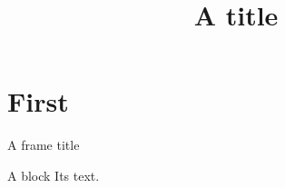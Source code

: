 \documentclass[aspectratio=169]{beamer}
\title{A title}
\begin{document}
\section{First}
\begin{frame}{A frame title}
\begin{block}{A block}
Its text.
\end{block}
\end{frame}
\end{document}
